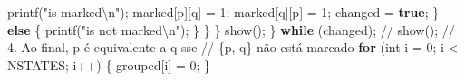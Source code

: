\documentclass[
  brazilian,
  letterpaper,
]{book}
\newenvironment{Shaded}{\begin{snugshade}}{\end{snugshade}}
\newcommand{\CommentTok}[1]{\textcolor[rgb]{0.37,0.37,0.37}{#1}}
\newcommand{\ControlFlowTok}[1]{\textcolor[rgb]{0.00,0.23,0.31}{\textbf{#1}}}
\newcommand{\DataTypeTok}[1]{\textcolor[rgb]{0.68,0.00,0.00}{#1}}
\newcommand{\DecValTok}[1]{\textcolor[rgb]{0.68,0.00,0.00}{#1}}
\newcommand{\KeywordTok}[1]{\textcolor[rgb]{0.00,0.23,0.31}{\textbf{#1}}}
\newcommand{\NormalTok}[1]{\textcolor[rgb]{0.00,0.23,0.31}{#1}}
\newcommand{\OperatorTok}[1]{\textcolor[rgb]{0.37,0.37,0.37}{#1}}
\newcommand{\SpecialCharTok}[1]{\textcolor[rgb]{0.37,0.37,0.37}{#1}}
\newcommand{\StringTok}[1]{\textcolor[rgb]{0.13,0.47,0.30}{#1}}
\theoremstyle{plain}
\theoremstyle{definition}
\theoremstyle{remark}
\begin{document}
\begin{Shaded}
\begin{Highlighting}[]
\NormalTok{                            printf}\OperatorTok{(}\StringTok{"is marked}\SpecialCharTok{\textbackslash{}n}\StringTok{"}\OperatorTok{);}
\NormalTok{                            marked}\OperatorTok{[}\NormalTok{p}\OperatorTok{][}\NormalTok{q}\OperatorTok{]} \OperatorTok{=} \DecValTok{1}\OperatorTok{;}
\NormalTok{                            marked}\OperatorTok{[}\NormalTok{q}\OperatorTok{][}\NormalTok{p}\OperatorTok{]} \OperatorTok{=} \DecValTok{1}\OperatorTok{;}
\NormalTok{                            changed }\OperatorTok{=} \KeywordTok{true}\OperatorTok{;}
                        \OperatorTok{\}}
                        \ControlFlowTok{else}
                        \OperatorTok{\{}
\NormalTok{                            printf}\OperatorTok{(}\StringTok{"is not marked}\SpecialCharTok{\textbackslash{}n}\StringTok{"}\OperatorTok{);}
                        \OperatorTok{\}}
                    \OperatorTok{\}}
                \OperatorTok{\}}
\NormalTok{        show}\OperatorTok{();}
    \OperatorTok{\}} \ControlFlowTok{while} \OperatorTok{(}\NormalTok{changed}\OperatorTok{);}
    \CommentTok{// show();}
    \CommentTok{//  4. Ao final, p é equivalente a q sse}
    \CommentTok{//     \{p, q\} não está marcado}
    \ControlFlowTok{for} \OperatorTok{(}\DataTypeTok{int}\NormalTok{ i }\OperatorTok{=} \DecValTok{0}\OperatorTok{;}\NormalTok{ i }\OperatorTok{\textless{}}\NormalTok{ NSTATES}\OperatorTok{;}\NormalTok{ i}\OperatorTok{++)}
    \OperatorTok{\{}
\NormalTok{        grouped}\OperatorTok{[}\NormalTok{i}\OperatorTok{]} \OperatorTok{=} \DecValTok{0}\OperatorTok{;}
    \OperatorTok{\}}


\end{Highlighting}
\end{Shaded}
\end{document}
